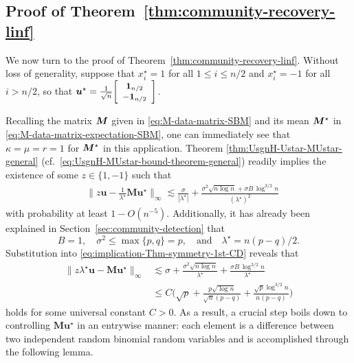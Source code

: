 \subsection{Proof of Theorem~\ref{thm:community-recovery-linf}} 

We now turn to the proof of Theorem~\ref{thm:community-recovery-linf}. 
Without loss of generality, suppose that $x_i^{\star}=1$ for all $1\leq i\leq n/2$  and $x_i^{\star}=-1$ for all $i> n/2$, so that 
$\bm{u}^{\star} =\frac{1}{\sqrt{n}}  {\small
\left[\begin{array}{c}
\bm{1}_{n/2}\\
-\bm{1}_{n/2}
\end{array}\right] }$. 



Recalling the matrix ${\boldsymbol M}$ given in \eqref{eq:M-data-matrix-SBM} and its mean ${\boldsymbol M}^{\star}$ in \eqref{eq:M-data-matrix-expectation-SBM}, 
one can immediately see that $\kappa=\mu=r=1$ for ${\boldsymbol M}^{\star}$ in this application. 
Theorem \ref{thm:UsgnH-Ustar-MUstar-general} (cf.~\eqref{eq:UsgnH-MUstar-bound-theorem-general}) readily implies 
the existence of some $z\in\{1,-1\}$ such that
%
\begin{align}
 & \Big\| z\bm{u}-\frac{1}{\lambda^{\star}}\bm{M}\bm{u}^{\star}\Big\|_{\infty}
\lesssim\frac{\sigma}{|\lambda^{\star}|}+\frac{\sigma^{2}\sqrt{n\log n}+\sigma B \,{\log^{3/2}n}}{(\lambda^{\star})^{2}} 
\label{eq:implication-Thm-symmetry-1st-CD}
\end{align}
%
with probability at least $1-O(n^{-5})$. Additionally, it has already been explained in Section~\ref{sec:community-detection} that  
%
\[
	 B=1,\quad\sigma^{2}\leq\max\{p,q\}=p, \quad \text{and} \quad \lambda^{\star}={n(p-q)}/{2}.
\]
%
Substitution into \eqref{eq:implication-Thm-symmetry-1st-CD} reveals that
%
\begin{align}
	\big\| z\lambda^{\star}\bm{u}-\bm{M}\bm{u}^{\star} \big\|_{\infty} & \lesssim\sigma+\frac{\sigma^{2}\sqrt{n\log n}}{\lambda^{\star}}+\frac{\sigma B\,\log^{3/2}n}{\lambda^{\star}}\nonumber \\
 	& \leq  C \Big( \sqrt{p}+\frac{p\sqrt{\log n}}{\sqrt{n}(p-q)}+\frac{\sqrt{p}\log^{3/2}n}{n(p-q)} \Big)
	\label{eq:z-lambda-u-MU-bound-CD}
\end{align}
%
holds for some universal constant $C>0$.
As a result, a crucial step boils down to controlling $\bm{M}\bm{u}^{\star}$ in an entrywise manner: each element is a difference between two independent random binomial random variables and  is accomplished through the following lemma. 
